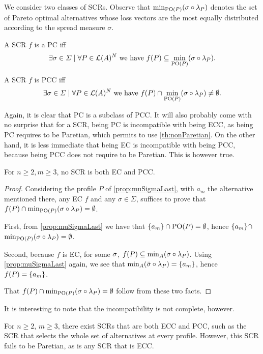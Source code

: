 We consider two classes of \acp{SCR}. 
Observe that $\mustar$ denotes the set of Pareto optimal alternatives whose loss vectors are the most equally distributed according to the spread measure $\sigma$.

\begin{definition} A \ac{SCR} $f$ is a \ac{PC} iff \[\exists \sigma \in \Sigma \suchthat \forall P \in \linors^N \text{ we have } f(P) \subseteq \mustar.\]
\end{definition}

\begin{definition} A \ac{SCR} $f$ is \ac{PCC} iff \[\exists \sigma \in \Sigma \suchthat \forall P \in \linors^N \text{ we have } f(P) \cap \mustar \neq \emptyset.\]
\end{definition}

Again, it is clear that \ac{PC} is a subclass of \ac{PCC}. It will also probably come with no surprise that for a \ac{SCR}, being \ac{PC} is incompatible with being \ac{ECC}, as being \ac{PC} requires to be Paretian, which permits to use \cref{th:nonParetian}. On the other hand, it is less immediate that being \ac{EC} is incompatible with
being \ac{PCC}, because being \ac{PCC} does not require to be Paretian. This is however true.

\begin{theorem} \label{th:incompatibility} 
	For $n ≥ 2, m ≥ 3$, no \ac{SCR} is both \ac{EC} and \ac{PCC}.
\end{theorem}
\begin{proof}	
	Considering the profile $P$ of \cref{prop:muSigmaLast}, with $a_m$ the alternative mentioned there, any \ac{EC} $f$ and any $\sigma \in \Sigma$, suffices to prove that $f(P) \cap {\mustar[\sigma][P]} = \emptyset$.
	
	First, from \cref{prop:muSigmaLast} we have that
	$\{a_m\} \cap \text{PO}(P) = \emptyset$, hence $\{a_m\} \cap$ \break $ {\mustar[\sigma][P]} = \emptyset$. 
	
	Second, because $f$ is \ac{EC}, for some $\bar{\sigma}$, $f(P) \subseteq {\musigma[\sigmatop][P]}$. Using \cref{prop:muSigmaLast} again, we see that ${\musigma[\sigmatop][P]} = \set{a_m}$, hence $f(P) = \{a_m\}$.
	
	That $f(P) \cap {\mustar[\sigma][P]} = \emptyset$ follow from these two facts.
\end{proof}

It is interesting to note that the incompatibility is not complete, however.

\begin{remark}
	For $n ≥ 2$, $m ≥ 3$, there exist \acp{SCR} that are both \ac{ECC} and \ac{PCC}, such as the \ac{SCR} that selects the whole set of alternatives at every profile. However, this \ac{SCR} fails to be Paretian, as is any \ac{SCR} that is \ac{ECC}.
\end{remark}


